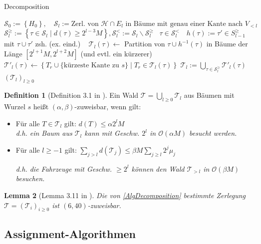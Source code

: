 \documentclass[a4paper,ngerman,12pt,bibtotoc]{scrartcl}
\newcommand{\LineFor}[2]{\State\algorithmicfor\ {#1}\ \algorithmicdo\ {#2} \algorithmicend\ \algorithmicfor}
\theoremstyle{definition}
\newtheorem{defn}{Definition}[section]
\theoremstyle{plain}
\newtheorem{lemma}[defn]{Lemma}
\theoremstyle{remark}
\newcommand{\Hc}{\mathcal{H}}
\newcommand{\Tc}{\mathcal{T}}
\newcommand{\Sc}{\mathcal{S}}
\newcommand{\Oc}{\mathcal{O}}
\begin{document}
	\begin{algorithm}[H]
		\caption{Decomposition}\label{AlgDecomposition}
		\begin{algorithmic}[1]
			\Procedure{Decomposition}{$\left(\Hc\right)$}
			\State $\Sc_0 := \left\lbrace H_0 \right\rbrace,\quad \Sc_l := \text{Zerl. von } \Hc\cap E_l \text{ in Bäume mit genau einer Kante nach } V_{<l}$
			\State $\Sc_l^{\geq} := \left\{\tau \in \Sc_l \mid d(\tau) \geq 2^{l-3}M\right\}, \Sc_l^< := \Sc_l \backslash \Sc_l^{\geq}$
			\LineFor{$\tau \in \Sc_l^{<}$}{$h(\tau) := \tau' \in S_{l-1}^{\geq}$ mit $\tau \cup \tau'$ zsh. (ex. eind.)}
			\For{$\tau \in \Sc_l^{\geq}$}
				\State $\Tc_l(\tau) \gets$ Partition von $\tau \cup h^{-1}(\tau)$ in Bäume der Länge $\left[2^{l+1}M, 2^{l+2}M\right]$ 
				\Statex \hspace{6.5em} (und evtl. ein kürzerer)
				\State $\Tc'_l(\tau) \gets \left\{T_r \cup \{\text{kürzeste Kante zu } s\} \mid T_r \in \Tc_l(\tau)\right\}$
			\EndFor
			\State $\Tc_l := \bigcup_{\tau \in \Sc_l^{\geq}}\Tc'_l(\tau)$
			\State \Return $\left(\Tc_l\right)_{l\geq 0}$
			\EndProcedure
		\end{algorithmic}
	\end{algorithm}
	
	\begin{defn}[Definition 3.1 in \cite{HetCVRP}]
		Ein Wald $\Tc = \bigcup_{l\geq 0} \Tc_l$ aus Bäumen mit Wurzel $s$ heißt $(\alpha, \beta)$-zuweisbar, wenn gilt:
		\begin{itemize}
			\item Für alle $T \in \Tc_l$ gilt: $d(T) \leq \alpha 2^l M$ \\
			\textit{d.h. ein Baum aus $\Tc_l$ kann mit Geschw. $2^l$ in $\Oc(\alpha M)$ besucht werden.}
			\item Für alle $l \geq -1$ gilt: $\sum_{j > l} d(\Tc_j) \leq \beta M \sum_{j\geq l} 2^j\mu_j$
			
			\textit{d.h. die Fahrzeuge mit Geschw. $\geq 2^l$ können den Wald $\Tc_{>l}$ in $\Oc(\beta M)$ besuchen.}
		\end{itemize}
	\end{defn}
	
	\begin{lemma}[Lemma 3.11 in \cite{HetCVRP}]
		Die von \cref{AlgDecomposition} bestimmte Zerlegung $\Tc = (\Tc_i)_{i\geq 0}$ ist $(6, 40)$-zuweisbar.
	\end{lemma}
	
	
	\subsection{Assignment-Algorithmen}
\end{document}
